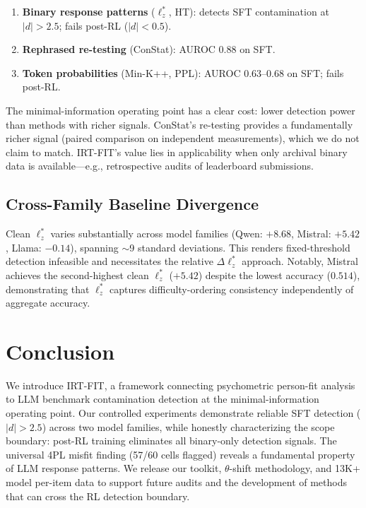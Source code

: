 \documentclass[11pt,a4paper]{article}
\begin{document}
\begin{enumerate}
    \item \textbf{Binary response patterns} ($\ell_z^*$, HT): detects SFT contamination at $|d| > 2.5$; fails post-RL ($|d| < 0.5$).
    \item \textbf{Rephrased re-testing} (ConStat): AUROC 0.88 on SFT.
    \item \textbf{Token probabilities} (Min-K++, PPL): AUROC 0.63--0.68 on SFT; fails post-RL.
\end{enumerate}

The minimal-information operating point has a clear cost: lower detection power than methods with richer signals. ConStat's re-testing provides a fundamentally richer signal (paired comparison on independent measurements), which we do not claim to match. IRT-FIT's value lies in applicability when only archival binary data is available---e.g., retrospective audits of leaderboard submissions.

\subsection{Cross-Family Baseline Divergence}

Clean $\ell_z^*$ varies substantially across model families (Qwen: $+8.68$, Mistral: $+5.42$, Llama: $-0.14$), spanning $\sim$9 standard deviations. This renders fixed-threshold detection infeasible and necessitates the relative $\Delta\ell_z^*$ approach. Notably, Mistral achieves the second-highest clean $\ell_z^*$ ($+5.42$) despite the lowest accuracy ($0.514$), demonstrating that $\ell_z^*$ captures difficulty-ordering consistency independently of aggregate accuracy.

\section{Conclusion}

We introduce IRT-FIT, a framework connecting psychometric person-fit analysis to LLM benchmark contamination detection at the minimal-information operating point. Our controlled experiments demonstrate reliable SFT detection ($|d| > 2.5$) across two model families, while honestly characterizing the scope boundary: post-RL training eliminates all binary-only detection signals. The universal 4PL misfit finding (57/60 cells flagged) reveals a fundamental property of LLM response patterns. We release our toolkit, $\theta$-shift methodology, and 13K+ model per-item data to support future audits and the development of methods that can cross the RL detection boundary.
\end{document}
